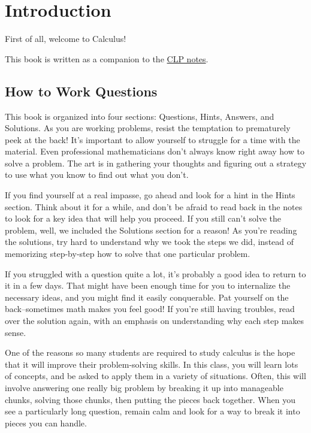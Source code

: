 %
%
\section*{Introduction}
First of all, welcome to Calculus!

This book is written as a companion to the \href{http://www.math.ubc.ca/~andrewr/maths100180/2016/CLP/clp_notes_100.pdf}{CLP notes}.

\subsection*{How to Work Questions}

This book is organized into four sections: Questions, Hints, Answers, and Solutions. As you are working problems, resist the temptation to prematurely peek at the back! It's important to allow yourself to struggle for a time with the material. Even professional mathematicians don't always know right away how to solve a problem. The art is in gathering your thoughts and figuring out a strategy to use what you know to find out what you don't.

If you find yourself at a real impasse, go ahead and look for a hint in the Hints section. Think about it for a while, and don't be afraid to read back in the notes to look for a key idea that will help you proceed. If you still can't solve the problem, well, we included the Solutions section for a reason! As you're reading the solutions, try hard to understand why we took the steps we did, instead of memorizing step-by-step how to solve that one particular problem.

If you struggled with a question quite a lot, it's probably a good idea to return to it in a few days. That might have been enough time for you to internalize the necessary ideas, and you might find it easily conquerable. Pat yourself on the back--sometimes math makes you feel good! If you're still having troubles, read over the solution again, with an emphasis on understanding why each step makes sense.

One of the reasons so many students are required to study calculus is the hope that it will improve their problem-solving skills. In this class, you will learn lots of concepts, and be asked to apply them in a variety of situations. Often, this will involve answering one really big problem by breaking it up into manageable chunks, solving those chunks, then putting the pieces back together. When you see a particularly long question, remain calm and look for a way to break it into pieces you can handle.

